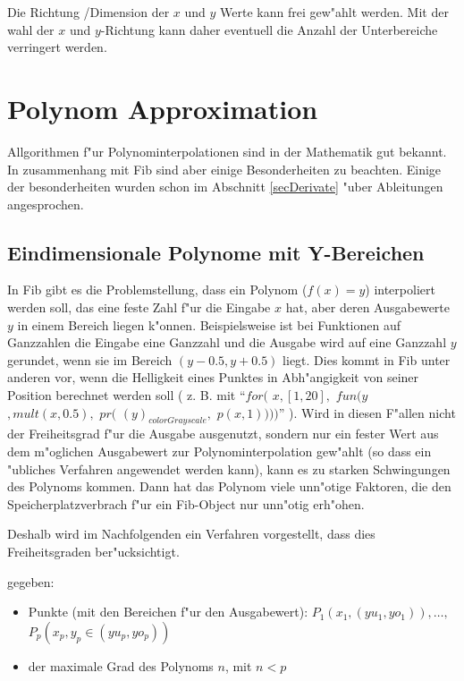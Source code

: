 Die Richtung /Dimension der $x$ und $y$ Werte kann frei gew"ahlt werden. Mit der wahl der $x$ und $y$-Richtung kann daher eventuell die Anzahl der Unterbereiche verringert werden.



\section{Polynom Approximation}

Allgorithmen f"ur Polynominterpolationen sind in der Mathematik gut bekannt. In zusammenhang mit Fib sind aber einige Besonderheiten zu beachten. Einige der besonderheiten wurden schon im Abschnitt \ref{secDerivate} "uber Ableitungen angesprochen.


\subsection{Eindimensionale Polynome mit Y-Bereichen}

In Fib gibt es die Problemstellung, dass ein Polynom ($f(x)=y$) interpoliert werden soll, das eine feste Zahl f"ur die Eingabe $x$ hat, aber deren Ausgabewerte $y$ in einem Bereich liegen k"onnen. Beispielsweise ist bei Funktionen auf Ganzzahlen die Eingabe eine Ganzzahl und die Ausgabe wird auf eine Ganzzahl $y$ gerundet, wenn sie im Bereich $(y-0.5, y+0.5)$ liegt. Dies kommt in Fib unter anderen vor, wenn die Helligkeit eines Punktes in Abh"angigkeit von seiner Position berechnet werden soll ( z. B. mit ``$for($ $x, [1, 20],$ $fun( y$ $,mult(x,0.5),$ $pr($ $(y)_{colorGrayscale},$ $p(x,1) ) ) )$'' ). Wird in diesen F"allen nicht der Freiheitsgrad f"ur die Ausgabe ausgenutzt, sondern nur ein fester Wert aus dem m"oglichen Ausgabewert zur Polynominterpolation gew"ahlt (so dass ein "ubliches Verfahren angewendet werden kann), kann es zu starken Schwingungen des Polynoms kommen. Dann hat das Polynom viele unn"otige Faktoren, die den Speicherplatzverbrach f"ur ein Fib-Object nur unn"otig erh"ohen.

Deshalb wird im Nachfolgenden ein Verfahren vorgestellt, dass dies Freiheitsgraden ber"ucksichtigt.

\bigskip\noindent
gegeben:
\begin{itemize}
 \item Punkte (mit den Bereichen f"ur den Ausgabewert): $P_1( x_1, (yu_1,yo_1 )), \ldots,$ $P_p( x_p, y_p \in (yu_p,yo_p ))$
 \item der maximale Grad des Polynoms $n$, mit $n < p$
\end{itemize}


